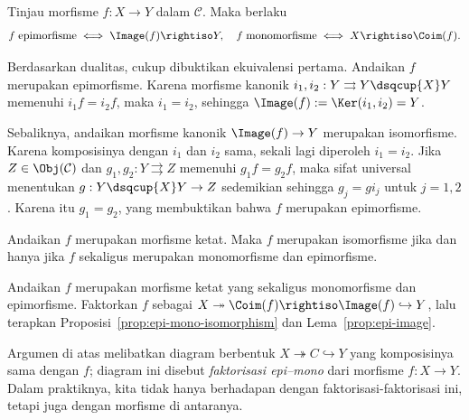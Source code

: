 \begin{lema}\label{prop:epi-image}
	Tinjau morfisme $f: X \to Y$ dalam $\mathcal{C}$. Maka berlaku
	\[ f\;\text{epimorfisme} \iff \Image(f) \rightiso Y, \quad
	   f\;\text{monomorfisme} \iff X \rightiso \Coim(f). \]
\end{lema}

\begin{bukti}
	Berdasarkan dualitas, cukup dibuktikan ekuivalensi pertama. Andaikan $f$
	merupakan epimorfisme. Karena morfisme kanonik
	$i_1, i_2: Y \rightrightarrows Y \dsqcup{X} Y$ memenuhi
	$i_1 f = i_2 f$, maka $i_1 = i_2$, sehingga
	$\Image(f) := \Ker(i_1, i_2) = Y$.

	Sebaliknya, andaikan morfisme kanonik $\Image(f) \to Y$ merupakan
	isomorfisme. Karena komposisinya dengan $i_1$ dan $i_2$ sama, sekali lagi
	diperoleh $i_1 = i_2$. Jika $Z \in \Obj(\mathcal{C})$ dan
	$g_1, g_2: Y \rightrightarrows Z$ memenuhi $g_1 f = g_2 f$, maka sifat
	universal menentukan $g: Y \dsqcup{X} Y \to Z$ sedemikian sehingga
	$g_j = g i_j$ untuk $j=1,2$. Karena itu $g_1 = g_2$, yang membuktikan
	bahwa $f$ merupakan epimorfisme.
\end{bukti}

\begin{proposisi}\label{prop:strict-isomorphism}
	Andaikan $f$ merupakan morfisme ketat. Maka $f$ merupakan isomorfisme jika
	dan hanya jika $f$ sekaligus merupakan monomorfisme dan epimorfisme.
\end{proposisi}

\begin{bukti}
	Andaikan $f$ merupakan morfisme ketat yang sekaligus monomorfisme dan
	epimorfisme. Faktorkan $f$ sebagai
	$X \twoheadrightarrow \Coim(f) \rightiso \Image(f) \hookrightarrow Y$,
	lalu terapkan Proposisi~\ref{prop:epi-mono-isomorphism} dan
	Lema~\ref{prop:epi-image}.
\end{bukti}

Argumen di atas melibatkan diagram berbentuk
$X \twoheadrightarrow C \hookrightarrow Y$ yang komposisinya sama dengan
$f$; diagram ini disebut \emph{faktorisasi epi--mono} dari morfisme
$f: X \to Y$. Dalam praktiknya, kita tidak hanya berhadapan dengan
faktorisasi-faktorisasi ini, tetapi juga dengan morfisme di antaranya.

